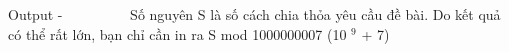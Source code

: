 Output
-          Số nguyên S là số cách chia thỏa yêu cầu đề bài. Do kết quả có thể rất lớn, bạn chỉ cần in ra S mod 1000000007 (10   $^    9   $   + 7)